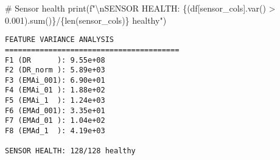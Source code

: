 \documentclass[
  letterpaper,
  DIV=11,
  numbers=noendperiod]{scrartcl}
\newenvironment{Shaded}{\begin{snugshade}}{\end{snugshade}}
\newcommand{\BuiltInTok}[1]{\textcolor[rgb]{0.00,0.23,0.31}{#1}}
\newcommand{\CharTok}[1]{\textcolor[rgb]{0.13,0.47,0.30}{#1}}
\newcommand{\CommentTok}[1]{\textcolor[rgb]{0.37,0.37,0.37}{#1}}
\newcommand{\FloatTok}[1]{\textcolor[rgb]{0.68,0.00,0.00}{#1}}
\newcommand{\NormalTok}[1]{\textcolor[rgb]{0.00,0.23,0.31}{#1}}
\newcommand{\OperatorTok}[1]{\textcolor[rgb]{0.37,0.37,0.37}{#1}}
\newcommand{\SpecialCharTok}[1]{\textcolor[rgb]{0.37,0.37,0.37}{#1}}
\newcommand{\SpecialStringTok}[1]{\textcolor[rgb]{0.13,0.47,0.30}{#1}}
\renewenvironment{Shaded}{%
  \begin{tcolorbox}[%
    enhanced,%
    colback=codebg,%
    colframe=codebg,%
    borderline west={3pt}{0pt}{sectionblue},%
    fontupper=\small\ttfamily,%
    boxrule=0pt,%
    arc=0pt,%
    boxsep=5pt,%
    left=2mm,%
    right=2mm,%
    top=2mm,%
    bottom=2mm%
  ]%
}{%
  \end{tcolorbox}%
}
\begin{document}
\begin{Shaded}
\begin{Highlighting}[]
\CommentTok{\# Sensor health}
\BuiltInTok{print}\NormalTok{(}\SpecialStringTok{f"}\CharTok{\textbackslash{}n}\SpecialStringTok{SENSOR HEALTH: }\SpecialCharTok{\{}\NormalTok{(df[sensor\_cols].var() }\OperatorTok{\textgreater{}} \FloatTok{0.001}\NormalTok{)}\SpecialCharTok{.}\BuiltInTok{sum}\NormalTok{()}\SpecialCharTok{\}}\SpecialStringTok{/}\SpecialCharTok{\{}\BuiltInTok{len}\NormalTok{(sensor\_cols)}\SpecialCharTok{\}}\SpecialStringTok{ healthy"}\NormalTok{)}
\end{Highlighting}
\end{Shaded}

\begin{verbatim}
FEATURE VARIANCE ANALYSIS
========================================
F1 (DR      ): 9.55e+08
F2 (DR_norm ): 5.89e+03
F3 (EMAi_001): 6.90e+01
F4 (EMAi_01 ): 1.88e+02
F5 (EMAi_1  ): 1.24e+03
F6 (EMAd_001): 3.35e+01
F7 (EMAd_01 ): 1.04e+02
F8 (EMAd_1  ): 4.19e+03

SENSOR HEALTH: 128/128 healthy
\end{verbatim}
\end{document}
